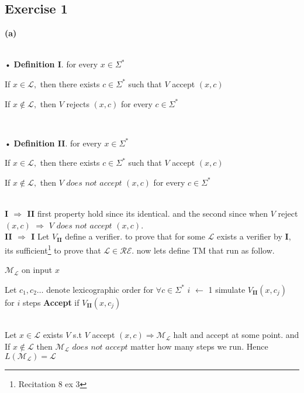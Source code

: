 \documentclass[12pt]{article}
\begin{document}
\subsection{Exercise 1}
\textbf{(a)}\\\\
\begin{list}{•}{  \textbf{ Definition I}. for every $x\in \Sigma^*$}
\item If $x\in \mathcal{L},$ then there exists $c\in \Sigma^*$ such that $V$ accept $(x,c)$
\item If $x\notin \mathcal{L},$  then $V$ rejects $(x, c)$ for every $c\in \Sigma^*$
\end{list}
\hrulefill \\
\begin{list}{•}{  \textbf{ Definition II}. for every $x\in \Sigma^*$}
\item If $x\in \mathcal{L},$ then there exists $c\in \Sigma^*$ such that $V$ accept $(x,c)$
\item If $x\notin \mathcal{L},$  then $V$ $does$ $not$ $ accept $ $(x, c)$ for every $c\in \Sigma^*$
\end{list}
\hrulefill\\ 
\textbf{I $\Rightarrow$ II} first property hold since its identical. and the second since when $V$ reject  $(x,c)$  $\Rightarrow$ $V$  $does$ $not$ $ accept $  $(x,c)$.\\
\textbf{II $\Rightarrow$ I} Let $V_{\textbf{II}}$ define  a verifier. to  prove that for some $\mathcal{L}$ exists  a verifier by \textbf{I}, its sufficient\footnote{Recitation 8 ex 3} to prove that $\mathcal{L}\in \mathcal{RE}$. now lets define TM that run as follow. 
\begin{algorithm}
\caption{  $\mathcal{M_L}$ on input $x$ }\label{alg:cap}
\begin{algorithmic}
\State Let $c_1,c_2\dots$ denote  lexicographic order for $\forall c \in \Sigma^*$
\State $i$  $\leftarrow$ 1
\State  simulate $V_{\textbf{II}}(x,c_j)$ 
for $i$ steps
\State \textbf{Accept}{ if $V_{\textbf{II}}(x,c_j)$  } 
\EndFor
\EndWhile
\end{algorithmic}
\end{algorithm}
\\
Let $x\in\mathcal{L}  $ exists $V$ s.t  $V$ accept $(x,c)\Rightarrow \mathcal{M_L}$ halt and accept at some point.
and If $x\notin\mathcal{L}  $ then  $\mathcal{M_L}$ $does$ $ not$ $ accept$ matter how many steps we run.
Hence 
$L(\mathcal{M_L})=\mathcal{L}$
\end{document}
